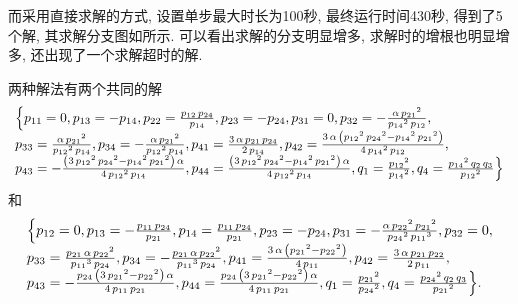 而采用直接求解的方式, 设置单步最大时长为100秒, 最终运行时间430秒, 得到了5个解, 其求解分支图如所示. 可以看出求解的分支明显增多, 求解时的增根也明显增多, 还出现了一个求解超时的解.  

两种解法有两个共同的解
\begin{equation}
\renewcommand{\arraystretch}{1.2}
\begin{array}{l}
\dbrace{
{{p}_{11}}=0,
{{p}_{13}}=-{{p}_{14}},
{{p}_{22}}=\frac{{{p}_{12}}\,{{p}_{24}}}{{{p}_{14}}},
{{p}_{23}}=-{{p}_{24}},
{{p}_{31}}=0,
{{p}_{32}}=-\frac{\alpha\,{{{p}_{21}}}^{2}}{{{{p}_{14}}}^{2}\,{{p}_{12}}},\\ 
{{p}_{33}}=\frac{\alpha\,{{{p}_{21}}}^{2}}{{{{p}_{12}}}^{2}\,{{p}_{14}}},
{{p}_{34}}=-\frac{\alpha\,{{{p}_{21}}}^{2}}{{{{p}_{12}}}^{2}\,{{p}_{14}}},
{{p}_{41}}=\frac{3\,\alpha\,{{p}_{21}}\,{{p}_{24}}}{2\,{{p}_{14}}},
{{p}_{42}}=\frac{3\,\alpha\,\left( {{{p}_{12}}}^{2}\,{{{p}_{24}}}^{2}-{{{p}_{14}}}^{2}\,{{{p}_{21}}}^{2}\right) }{4\,{{{p}_{14}}}^{2}\,{{p}_{12}}},\\ 
{{p}_{43}}=-\frac{\left( 3\,{{{p}_{12}}}^{2}\,{{{p}_{24}}}^{2}-{{{p}_{14}}}^{2}\,{{{p}_{21}}}^{2}\right) \,\alpha}{4\,{{{p}_{12}}}^{2}\,{{p}_{14}}},
{{p}_{44}}=\frac{\left( 3\,{{{p}_{12}}}^{2}\,{{{p}_{24}}}^{2}-{{{p}_{14}}}^{2}\,{{{p}_{21}}}^{2}\right) \,\alpha}{4\,{{{p}_{12}}}^{2}\,{{p}_{14}}},
{{q}_{1}}=\frac{{{{p}_{12}}}^{2}}{{{{p}_{14}}}^{2}},
{{q}_{4}}=\frac{{{{p}_{14}}}^{2}\,{{q}_{2}}\,{{q}_{3}}}{{{{p}_{12}}}^{2}}
}
\end{array}
\end{equation}
和
\begin{equation}
\renewcommand{\arraystretch}{1.2}
\begin{array}{l}
\dbrace{
{{p}_{12}}=0,
{{p}_{13}}=-\frac{{{p}_{11}}\,{{p}_{24}}}{{{p}_{21}}},
{{p}_{14}}=\frac{{{p}_{11}}\,{{p}_{24}}}{{{p}_{21}}},
{{p}_{23}}=-{{p}_{24}},
{{p}_{31}}=-\frac{\alpha\,{{{p}_{22}}}^{2}\,{{{p}_{21}}}^{2}}{{{{p}_{24}}}^{2}\,{{{p}_{11}}}^{3}},
{{p}_{32}}=0,\\ 
{{p}_{33}}=\frac{{{p}_{21}}\,\alpha\,{{{p}_{22}}}^{2}}{{{{p}_{11}}}^{3}\,{{p}_{24}}},
{{p}_{34}}=-\frac{{{p}_{21}}\,\alpha\,{{{p}_{22}}}^{2}}{{{{p}_{11}}}^{3}\,{{p}_{24}}},
{{p}_{41}}=\frac{3\,\alpha\,\left( {{{p}_{21}}}^{2}-{{{p}_{22}}}^{2}\right) }{4\,{{p}_{11}}},
{{p}_{42}}=\frac{3\,\alpha\,{{p}_{21}}\,{{p}_{22}}}{2\,{{p}_{11}}},\\ 
{{p}_{43}}=-\frac{{{p}_{24}}\,\left( 3\,{{{p}_{21}}}^{2}-{{{p}_{22}}}^{2}\right) \,\alpha}{4\,{{p}_{11}}\,{{p}_{21}}},
{{p}_{44}}=\frac{{{p}_{24}}\,\left( 3\,{{{p}_{21}}}^{2}-{{{p}_{22}}}^{2}\right) \,\alpha}{4\,{{p}_{11}}\,{{p}_{21}}},
{{q}_{1}}=\frac{{{{p}_{21}}}^{2}}{{{{p}_{24}}}^{2}},
{{q}_{4}}=\frac{{{{p}_{24}}}^{2}\,{{q}_{2}}\,{{q}_{3}}}{{{{p}_{21}}}^{2}}
}.
\end{array}
\end{equation}

